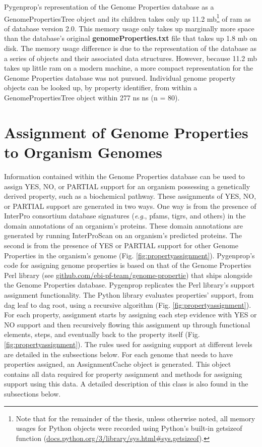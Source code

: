 Pygenprop's representation of the Genome Properties database as a 
GenomePropertiesTree object and its children takes only up 11.2 
\gls{mb}\footnote{Note that for the remainder of the thesis, unless otherwise 
noted, all memory usages for Python objects were recorded using Python's 
built-in getsizeof function 
(\href{http://docs.python.org/3/library/sys.html\#sys.getsizeof}{docs.python.org/3/library/sys.html\#sys.getsizeof}).} 
of \gls{ram} as of database version 2.0. This memory usage only takes up 
marginally more space than the database's original \textbf{genomeProperties.txt} 
file that takes up 1.8 \gls{mb} on disk. The memory usage difference is due to 
the representation of the database as a series of objects and their associated 
data structures. However, because 11.2 \gls{mb} takes up little \gls{ram} on a 
modern machine, a more compact representation for the Genome Properties database 
was not pursued. Individual genome property objects can be looked up, by 
property identifier, from within a GenomePropertiesTree object within 277 ns 
 ns (\gls{n} = 80).

\section{Assignment of Genome Properties to Organism Genomes} \label{property-assign}

Information contained within the Genome Properties database can be used to 
assign YES, NO, or PARTIAL support for an organism possessing a genetically 
derived property, such as a biochemical pathway. These assignments of YES, NO, 
or PARTIAL support are generated in two ways. One way is from the presence of 
InterPro consortium database signatures (\textit{e}.\textit{g}., \gls{pfam}s, 
\gls{tigr}s, and others) in the domain annotations of an organism's proteins. 
These domain annotations are generated by running InterProScan 
\cite{jones2014interproscan} on an organism's predicted proteins. The second is 
from the presence of YES or PARTIAL support for other Genome Properties in the 
organism's genome (Fig. \ref{fig:propertyassignment}). Pygenprop's code for 
assigning genome properties is based on that of the Genome Properties Perl 
library (see 
\href{http://github.com/ebi-pf-team/genome-properties}{github.com/ebi-pf-team/genome-propertie}) 
that ships alongside the Genome Properties database. Pygenprop replicates the 
Perl library's support assignment functionality. The Python library evaluates 
properties' support, from \gls{dag} leaf to \gls{dag} root, using a recursive 
algorithm (Fig. \ref{fig:propertyassignment}). For each property, assignment 
starts by assigning each step evidence with YES or NO support and then 
recursively flowing this assignment up through functional elements, steps, and 
eventually back to the property itself (Fig. \ref{fig:propertyassignment}). The 
rules used for assigning support at different levels are detailed in the 
subsections below. For each genome that needs to have properties assigned, an 
AssignmentCache object is generated. This object contains all data required for 
property assignment and methods for assigning support using this data. A 
detailed description of this class is also found in the subsections below.

